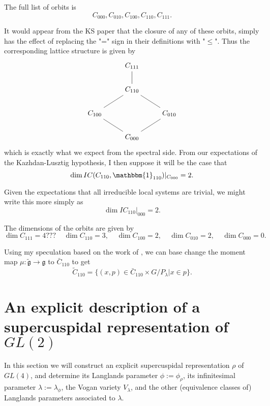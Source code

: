 \documentclass{memoir}
\newcommand{\mf}{\mathfrak}
\theoremstyle{definition}
\begin{document}
	The full list of orbits is
	$$C_{000}, C_{010}, C_{100}, C_{110}, C_{111}.$$
	
	It would appear from the KS paper that the closure of any of these orbits, simply has the effect of replacing the "=" sign in their definitions with "$\leq$".  
	Thus the corresponding lattice structure is given by 
	$$\begin{tikzcd}
		& {C_{111}} \\
		& {C_{110}} \\
		{C_{100}} && {C_{010}} \\
		& {C_{000}}
		\arrow[no head, from=1-2, to=2-2]
		\arrow[no head, from=2-2, to=3-1]
		\arrow[no head, from=3-1, to=4-2]
		\arrow[no head, from=4-2, to=3-3]
		\arrow[no head, from=3-3, to=2-2]
	\end{tikzcd}$$
%
	which is exactly what we expect from the spectral side. 
	From our expectations of the Kazhdan-Lusztig hypothesis, I then suppose it will be the case that
	$$\dim IC(C_{110}, \mathbbm{1}_{110})|_{C_{000}}=2.$$
	
	Given the expectations that all irreducible local systems are trivial, we might write this more simply as
	$$\dim IC_{110}|_{000}=2.$$
	
	The dimensions of the orbits are given by
	$$\dim C_{111}=4??? \ \ \ \ \ \dim C_{110}=3, \ \ \ \ \  \dim C_{100}=2, \ \ \ \ \ \dim C_{010}=2,  \ \ \ \ \ \dim C_{000}=0.$$
	
	Using my speculation based on the work of \cite{Chr}, we can base change the moment map $\mu:\tilde{\mf{g}}\to\mf{g}$ to $\bar{C}_{110}$ to get
	$$\tilde{C}_{110}=\{(x, p)\in \bar{C}_{110}\times G/P_\lambda | x\in p\}.$$
	
	
	
	
	
	
	
	
	
	
	
	
	
	
	
	
	


	
	\section{An explicit description of a supercuspidal representation of $GL(2)$}
	
	In this section we will construct an explicit supercuspidal representation $\rho$ of $GL(4)$, and determine its Langlands parameter $\phi:=\phi_\rho$, its infinitesimal parameter $\lambda:=\lambda_\phi$, the Vogan variety $V_\lambda$, and the other (equivalence classes of) Langlands parameters associated to $\lambda$.  
	
\end{document}
